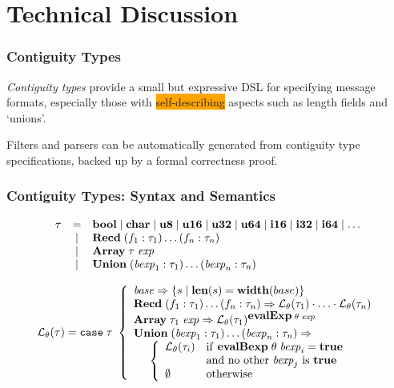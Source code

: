 \documentclass{beamer}
\newcommand{\kemph}[1]{\colorbox{orange}{#1}}
\newcommand{\konst}[1]{\ensuremath{\mbox{\bf{#1}}}}
\newcommand{\set}[1]{\{ {#1} \}}
\newcommand{\LangTheta}[1]{\ensuremath{{\mathcal L}_{\theta}({#1})}}
\begin{document}
\section{Technical Discussion}

\begin{frame}\frametitle{Contiguity Types}

  \emph{Contiguity types} provide a small but expressive DSL for
specifying message formats, especially those with
\kemph{self-describing} aspects such as length fields and
`unions'.

\vspace*{5mm}
Filters and parsers can be automatically generated from
contiguity type specifications, backed up by a formal correctness
proof.

\end{frame}

\begin{frame}\frametitle{Contiguity Types: Syntax and Semantics}

\[
\begin{array}{rcl}
 \tau & = & \konst{bool} \mid \konst{char} \mid \konst{u8} \mid
 \konst{u16} \mid \konst{u32} \mid \konst{u64}  \mid \konst{i16} \mid
 \konst{i32} \mid \konst{i64} \mid \ldots \\
      & \mid & \konst{Recd}\; (f_1 : \tau_1) \ldots (f_n : \tau_n) \\
      & \mid & \konst{Array}\; \tau \; \mathit{exp} \\
      & \mid & \konst{Union}\; (\mathit{bexp}_1 : \tau_1) \ldots (\mathit{bexp}_n : \tau_n)
\end{array}
\]


\[
\LangTheta{\tau} =
\mathtt{case}\; \tau\
 \left\{
 \begin{array}{l}
 \mathit{base} \Rightarrow \set{s \mid \konst{len}(s) = \konst{width}(base)} \\
 \konst{Recd}\; (f_1 : \tau_1) \ldots (f_n : \tau_n)
      \Rightarrow \LangTheta{\tau_1} \cdot \ldots \cdot \LangTheta{\tau_n}
\\
 \konst{Array}\; \tau_1 \; \mathit{exp}
      \Rightarrow  \LangTheta{\tau_1}^{\konst{evalExp}\;\theta\;\mathit{exp}}
\\
 \konst{Union}\; (\mathit{bexp}_1 : \tau_1) \ldots (\mathit{bexp}_n : \tau_n) \Rightarrow \\
  \hspace*{5mm}
 \left\{
 \begin{array}{ll}
    \LangTheta{\tau_i} &  \mathrm{if}\ \konst{evalBexp}\;\theta\;\mathit{bexp}_i = \konst{true} \\
                  & \mathrm{and\ no\ other}\ \mathit{bexp}_j\ \mathrm{is}\ \konst{true}  \\
    \emptyset & \mathrm{otherwise}
 \end{array}
 \right.
 \\
\end{array}
 \right.
\]

\end{frame}
\end{document}
